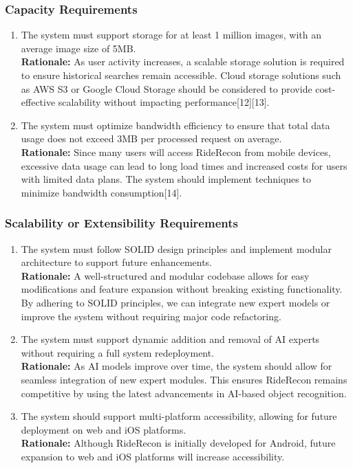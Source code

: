 \documentclass[]{article}
\begin{document}
\subsubsection{Capacity Requirements}
\label{ssub:capacity_requirements}
\begin{enumerate}[label={PR-C\arabic*.}]
    \item The system must support storage for at least 1 million images, with an average image size of 5MB.\\
	\textbf{Rationale:} As user activity increases, a scalable storage solution is required to ensure historical searches remain accessible. Cloud storage solutions such as AWS S3 or Google Cloud Storage should be considered to provide cost-effective scalability without impacting performance[12][13]. 
	\item The system must optimize bandwidth efficiency to ensure that total data usage does not exceed 3MB per processed request on average.\\
	\textbf{Rationale:} Since many users will access RideRecon from mobile devices, excessive data usage can lead to long load times and increased costs for users with limited data plans. The system should implement techniques to minimize bandwidth consumption[14].
\end{enumerate}

\subsubsection{Scalability or Extensibility Requirements}
\label{ssub:scalability_or_extensibility_requirements}
\begin{enumerate}[label={PR-SE\arabic*.}]
    \item The system must follow SOLID design principles and implement modular architecture to support future enhancements.\\ 
	\textbf{Rationale:} A well-structured and modular codebase allows for easy modifications and feature expansion without breaking existing functionality. By adhering to SOLID principles, we can integrate new expert models or improve the system without requiring major code refactoring.
	\item The system must support dynamic addition and removal of AI experts without requiring a full system redeployment.\\ 
	\textbf{Rationale:} As AI models improve over time, the system should allow for seamless integration of new expert modules. This ensures RideRecon remains competitive by using the latest advancements in AI-based object recognition.
	\item The system should support multi-platform accessibility, allowing for future deployment on web and iOS platforms.\\
	\textbf{Rationale:} Although RideRecon is initially developed for Android, future expansion to web and iOS platforms will increase accessibility.
\end{enumerate}
\end{document}
